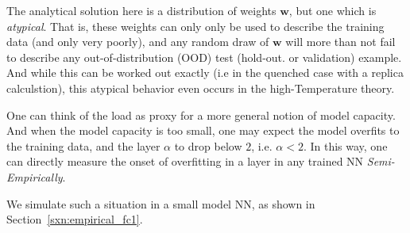 
The analytical solution here is a distribution of weights $\mathbf{w}$,
but one which is \emph{atypical}.  That is, these weights can only
only be used to describe the training data (and only very poorly),
and any random draw of $\mathbf{w}$ will more than not fail to
describe any out-of-distribution (OOD) test (hold-out. or validation) example.
And while this can be worked out exactly (i.e in the quenched case with a replica calculstion),
this atypical behavior even occurs in the high-Temperature theory.\cite{SST90}

One can think of the load as proxy for a more general notion of model capacity.
And  when the model capacity is too small, one may expect the model overfits to the training data,
and the layer $\alpha$ to drop below $2$, i.e. $\alpha< 2$.  In this way, one can
directly measure the onset of overfitting in a layer in any trained NN \emph{Semi-Empirically}.

We  simulate such a situation in a small model NN, as shown in Section~\ref{sxn:empirical_fc1}.






